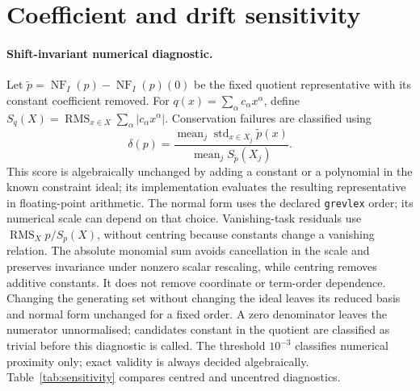 \documentclass[10pt]{article}
\newcommand{\NF}{\operatorname{NF}}
\begin{document}
\begin{table}[!htbp]
\centering
\footnotesize
\setlength{\tabcolsep}{3pt}
\tabInfl
\caption{Exploratory largest gaps (percentage points) between constructed permissive acceptance and literal task validity. Recon., Trivial and Incompl. give the additional accepted counts over the cell denominator; twins are marked p. A reconstructed incomplete answer belongs only to Recon. The 100-point twisted-cubic baseline gap is induced by its single-output interface. Permissive-policy gaps are nonzero in \inflLLMnonzero{} of \inflLLMcells{} LLM cells and at most \inflLLMmax{} points.}
\label{tab:inflation}
\end{table}

\section{Coefficient and drift sensitivity}\label{app:sensitivity}

\paragraph{Shift-invariant numerical diagnostic.} Let $\tilde p=\NF_I(p)-\NF_I(p)(0)$ be the fixed quotient representative with its constant coefficient removed. For $q(x)=\sum_\alpha c_\alpha x^\alpha$, define $S_q(X)=\operatorname{RMS}_{x\in X}\sum_\alpha |c_\alpha x^\alpha|$. Conservation failures are classified using
\[
\delta(p)=\frac{\operatorname{mean}_j\operatorname{std}_{x\in X_j}\tilde p(x)}{\operatorname{mean}_j S_{\tilde p}(X_j)}.
\]
This score is algebraically unchanged by adding a constant or a polynomial in the known constraint ideal; its implementation evaluates the resulting representative in floating-point arithmetic. The normal form uses the declared \texttt{grevlex} order; its numerical scale can depend on that choice. Vanishing-task residuals use $\operatorname{RMS}_X p/S_p(X)$, without centring because constants change a vanishing relation. The absolute monomial sum avoids cancellation in the scale and preserves invariance under nonzero scalar rescaling, while centring removes additive constants. It does not remove coordinate or term-order dependence. Changing the generating set without changing the ideal leaves its reduced basis and normal form unchanged for a fixed order. A zero denominator leaves the numerator unnormalised; candidates constant in the quotient are classified as trivial before this diagnostic is called. The threshold $10^{-3}$ classifies numerical proximity only; exact validity is always decided algebraically. Table~\ref{tab:sensitivity} compares centred and uncentred diagnostics.
\end{document}
